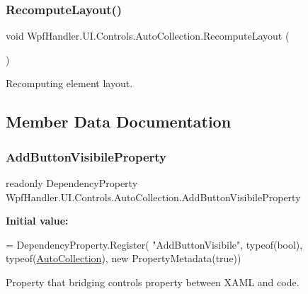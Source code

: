 \subsubsection{\texorpdfstring{Recompute\+Layout()}{RecomputeLayout()}}
{\footnotesize\ttfamily void Wpf\+Handler.\+U\+I.\+Controls.\+Auto\+Collection.\+Recompute\+Layout (\begin{DoxyParamCaption}{ }\end{DoxyParamCaption})\hspace{0.3cm}{\ttfamily [protected]}}



Recomputing element layout. 



\subsection{Member Data Documentation}
\mbox{\label{class_wpf_handler_1_1_u_i_1_1_controls_1_1_auto_collection_aff46124c0cd77747b466fa231ce4f264}} 
\subsubsection{\texorpdfstring{Add\+Button\+Visibile\+Property}{AddButtonVisibileProperty}}
{\footnotesize\ttfamily readonly Dependency\+Property Wpf\+Handler.\+U\+I.\+Controls.\+Auto\+Collection.\+Add\+Button\+Visibile\+Property\hspace{0.3cm}{\ttfamily [static]}}

{\bfseries Initial value\+:}
\begin{DoxyCode}
= DependencyProperty.Register(
          \textcolor{stringliteral}{"AddButtonVisibile"}, typeof(\textcolor{keywordtype}{bool}), typeof(\mbox{\hyperlink{class_wpf_handler_1_1_u_i_1_1_controls_1_1_auto_collection_a8bc71a7c43dfeca1d6ff113b12088c28}{AutoCollection}}),
          \textcolor{keyword}{new} PropertyMetadata(\textcolor{keyword}{true}))
\end{DoxyCode}


Property that bridging control\textquotesingle{}s property between X\+A\+ML and code. 

